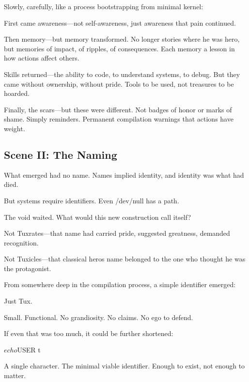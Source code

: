 Slowly, carefully, like a process bootstrapping from minimal kernel:

First came awareness---not self-awareness, just awareness that pain continued.

Then memory---but memory transformed. No longer stories where he was hero, but memories of impact, of ripples, of consequences. Each memory a lesson in how actions affect others.

Skills returned---the ability to code, to understand systems, to debug. But they came without ownership, without pride. Tools to be used, not treasures to be hoarded.

Finally, the scars---but these were different. Not badges of honor or marks of shame. Simply reminders. Permanent compilation warnings that actions have weight.

\bookdivider

\subsection{Scene II: The Naming}\label{scene-ii-the-naming}

What emerged had no name. Names implied identity, and identity was what had died.

But systems require identifiers. Even /dev/null has a path.

The void waited. What would this new construction call itself?

Not Tuxrates---that name had carried pride, suggested greatness, demanded recognition.

Not Tuxicles---that classical hero\textquotesingle s name belonged to the one who thought he was the protagonist.

From somewhere deep in the compilation process, a simple identifier emerged:


Just Tux.

Small. Functional. No grandiosity. No claims. No ego to defend.

If even that was too much, it could be further shortened:

\begin{codeblock}
$ echo $USER
t
\end{codeblock}

A single character. The minimal viable identifier. Enough to exist, not enough to matter.

